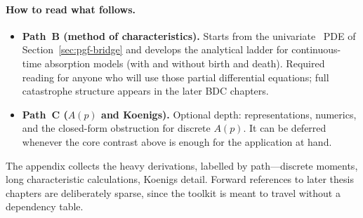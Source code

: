 \paragraph{How to read what follows.}
\begin{itemize}[leftmargin=*]
\item \textbf{Path~B (method of characteristics).}
Starts from the univariate \pgf\ PDE of Section~\ref{sec:pgf-bridge} and develops the analytical ladder for continuous-time absorption models (with and without birth and death). Required reading for anyone who will use those partial differential equations; full catastrophe structure appears in the later BDC chapters.
\item \textbf{Path~C ($A(p)$ and Koenigs).}
Optional depth: representations, numerics, and the closed-form obstruction for discrete $A(p)$. It can be deferred whenever the core contrast above is enough for the application at hand.
\end{itemize}

The appendix collects the heavy derivations, labelled by path---discrete moments, long characteristic calculations, Koenigs detail. Forward references to later thesis chapters are deliberately sparse, since the toolkit is meant to travel without a dependency table.
